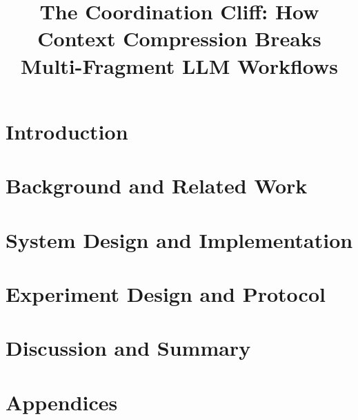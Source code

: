 \documentclass[english, online, cse, master]{dithesis}
\title{The Coordination Cliff: How Context Compression Breaks Multi-Fragment LLM Workflows}
\begin{document}
\pagestyle{empty}
\maketitlepage
\makecopyrightpage

 {
  
  
}

\setcounter{tocdepth}{2} %
\contents %



\mainmatter

\chapter{Introduction}
  \label{introduction}
  

\chapter{Background and Related Work}
  \label{relatedwork}
  

\chapter{System Design and Implementation}
  \label{implementation}
  

\chapter{Experiment Design and Protocol}
  \label{experiments}
  

\chapter{Discussion and Summary}
  \label{summary}
  

\printbibliography[heading=bibnumbered, title=\mybibname]

\startappendix
\chapter{Appendices}
  \label{appendix}
  
\end{document}
